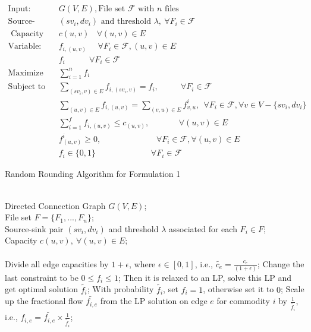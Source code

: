 \documentclass[onecolumn,11pt,journal, compsoc]{IEEEtran}
\begin{document}
	\begin{equation}
		\begin{aligned}
			\text{Input: Directed Connection Graph } &G(V, E), \text{File set } \mathcal{F} \text{ with } n \text{ files} \\
			\text{Source-sink~pair }&(sv_i, dv_i) \text{ and threshold }\lambda, ~\forall F_i \in \mathcal{F} \\
			\text{ Capacity }&c(u, v) ~~~~\forall (u, v)\in E \\
			\text{Variable: Flow } &f_{i, (u, v)} ~~~~~~\forall F_i \in \mathcal{F}, (u, v) \in E \\
			&f_i  ~~~~~~~~~~~~~\forall F_i \in \mathcal{F} \\
			\text{Maximize } &\sum_{i=1}^{n}f_i \\ 
			\text{Subject to } &\sum_{(sv_i,v) \in E}f_{i, (sv_i,v)} = f_i,  ~~~~~~~~~~~~\forall F_i \in \mathcal{F} \\
			&\sum_{(u, v) \in E}f_{i,(u, v)} = \sum_{(v, u) \in E}f_{v, u}^i,  ~~\forall F_i \in \mathcal{F}, \forall v \in V - \{sv_i,dv_i\} \\ 
			&\sum_{i=1}^{f}f_{i,(u, v)} \leq c_{(u, v)}, ~~~~~~~~~~~~~~~~\forall (u, v) \in E \\
			&f_{(u, v)}^i \geq 0, ~~~~~~~~~~~~~~~~~~~~~~~~~~~~~~\forall F_i \in \mathcal{F},  \forall (u, v) \in E \\
			&f_i \in \{0, 1\} ~~~~~~~~~~~~~~~~~~~~~~~~~~~~~~\forall F_i \in \mathcal{F}
		\end{aligned}
	\end{equation}
	
\newpage
	
		 \begin{algorithm}[t]
		 	\small
		 	\renewcommand{\algorithmicrequire}{\textbf{Input:}}
		 	\renewcommand\algorithmicensure {\textbf{Output:} }
		 	\caption{Random Rounding Algorithm for Formulation 1}
		 	\label{alg:randomrounding}
		 	\begin{algorithmic}[1] %
		 		\REQUIRE ~~\\ %
		 		Directed Connection Graph $G(V, E)$;\\
		 		File set $F = \{F_1, ..., F_n\}$;\\
		 		Source-sink pair $(sv_i, dv_i)$ and threshold $\lambda$ associated for each $ F_i \in F$;\\
		 		Capacity $c(u, v), ~ \forall (u, v)\in E$;\\
		 		\ENSURE ~~\\ %
		 		\STATE Divide all edge capacities by $1+\epsilon$, where $\epsilon  \in [0, 1]$, i.e., $\tilde{c_e} = \frac{c_e}{(1+\epsilon)}$;
		 		\STATE Change the last constraint to be 
		 		$0 \leq f_i \leq 1$;
		 		\STATE Then it is relaxed to an LP, solve this LP and get optimal solution $\tilde{f_i}$;
		 		\STATE With probability $\tilde{f_i}$, set $f_i = 1$, otherwise set it to $0$;
		 		\STATE Scale up the fractional flow $\tilde{f_{i,e}}$ from the LP solution on edge $e$ for commodity $i$ by $\frac{1}{\tilde{f_i}}$, i.e., $f_{i,e} = \tilde{f_{i,e}} \times \frac{1}{\tilde{f_i}}$;

		 	\end{algorithmic}
		 \end{algorithm}
	
\end{document}
